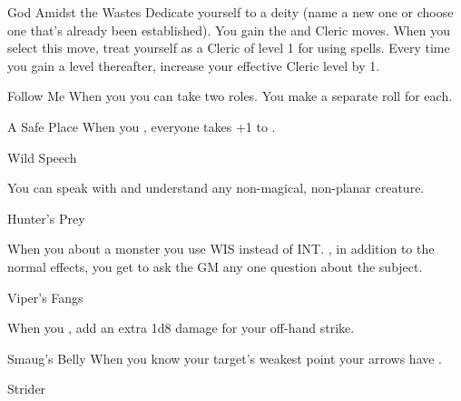 \documentclass[8pt]{extarticle}
\begin{document}
\begin{multicols}{2}
\begin{amove}{God Amidst the Wastes}
  Dedicate yourself to a deity (name a new one or choose one that’s
  already been established). You gain the  and
   Cleric moves. When you select this move, treat
  yourself as a Cleric of level 1 for using spells. Every time you
  gain a level thereafter, increase your effective Cleric level by 1.
\end{amove}

\begin{amove}{Follow Me}
  When you  you can take two
  roles. You make a separate roll for each.
\end{amove}

\begin{amove}{A Safe Place}
  When you , everyone takes +1
  to .
\end{amove}


\vfill\null
\columnbreak

\secondAdvances

\begin{amove}{Wild Speech}

  You can speak with and understand any non-magical, non-planar
  creature.
\end{amove}

\begin{amove}{Hunter’s Prey}

  When you  about a monster you use WIS instead of
  INT. \onMassiveSuccess, in addition to the normal effects, you get
  to ask the GM any one question about the subject.
\end{amove}

\begin{amove}{Viper’s Fangs}

  When you , add
  an extra 1d8 damage for your off-hand strike.
\end{amove}

\begin{amove}{Smaug’s Belly}
  When you know your target’s weakest point your arrows have
  .
\end{amove}

\begin{amove}{Strider}


\end{amove}
\end{multicols}
\end{document}
